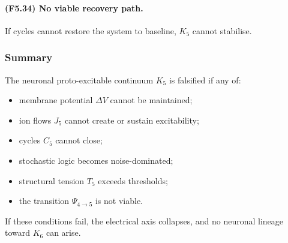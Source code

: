 \paragraph{(F5.34) No viable recovery path.}
If cycles cannot restore the system to baseline,
$K_5$ cannot stabilise.


\subsubsection{Summary}

The neuronal proto-excitable continuum $K_5$ is falsified if any of:

\begin{itemize}
    \item membrane potential $\Delta V$ cannot be maintained;
    \item ion flows $J_5$ cannot create or sustain excitability;
    \item cycles $C_5$ cannot close;
    \item stochastic logic becomes noise-dominated;
    \item structural tension $T_5$ exceeds thresholds;
    \item the transition $\Psi_{4\to 5}$ is not viable.
\end{itemize}

If these conditions fail, the electrical axis collapses,
and no neuronal lineage toward $K_6$ can arise.
